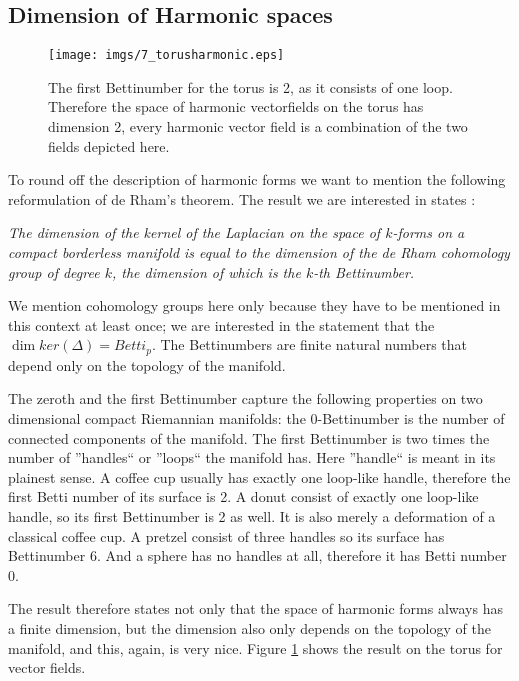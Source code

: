 

\subsection{Dimension of Harmonic spaces }
\label{subsec:vf_dimHarm}
\begin{figure}%
\begin{center}
\texttt{[image: imgs/7\_torusharmonic.eps]}%
\end{center}
\caption{The first Bettinumber for the torus is 2, as it consists of one loop. Therefore the space of harmonic vectorfields on the torus has dimension 2, every harmonic vector field is a combination of the two fields depicted here.}%
\label{fig:vftorusharmonic}%
\end{figure}

To round off the description of harmonic forms we want to mention the following reformulation of de Rham's theorem.
The result we are interested in states : 
\vspace{0.5cm}

\emph{The dimension of the kernel of the Laplacian on the space of $k$-forms on a compact borderless manifold is equal to the dimension of the de Rham cohomology group of degree $k$, the dimension of which is the $k$-th Bettinumber.} 

\vspace{0.5cm}
We mention cohomology groups here only because they have to be mentioned in this context at least once; we are interested in the statement that the $\dim ker(\Delta) = Betti_p$. The Bettinumbers are finite natural numbers that depend only on the topology of the manifold. 

The zeroth and the first Bettinumber capture the following properties on two dimensional compact Riemannian manifolds: the 0-Bettinumber is the number of connected components of the manifold. The first Bettinumber is two times the number of ''handles`` or ''loops`` the manifold has. Here ''handle`` is meant in its plainest sense. A coffee cup usually has exactly one loop-like handle, therefore the first Betti number of its surface is 2. A donut consist of exactly one loop-like handle, so its first Bettinumber is 2 as well. It is also merely a deformation of a classical coffee cup. A pretzel consist of three handles so its surface has Bettinumber 6. And a sphere has no handles at all, therefore it has Betti number 0.

The result therefore states not only that the space of harmonic forms always has a finite dimension, but the dimension also only depends on the topology of the manifold, and this, again, is very nice. Figure \ref{fig:vftorusharmonic} shows the result on the torus for vector fields.

